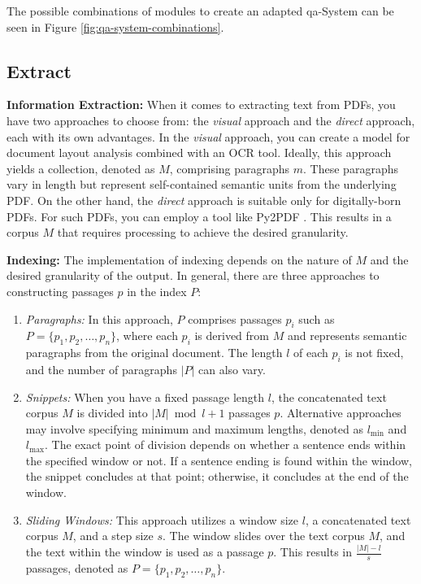 The possible combinations of modules to create an adapted \gls{qa}-System can be seen in Figure \ref{fig:qa-system-combinations}.


\subsection{Extract}
\label{subsec:extract}

\textbf{Information Extraction:} When it comes to extracting text from PDFs, you have two approaches to choose from: the \textit{visual} approach and the \textit{direct} approach, each with its own advantages. In the \textit{visual} approach, you can create a model for document layout analysis combined with an OCR tool. Ideally, this approach yields a collection, denoted as $M$, comprising paragraphs $m$. These paragraphs vary in length but represent self-contained semantic units from the underlying PDF. On the other hand, the \textit{direct} approach is suitable only for digitally-born PDFs. For such PDFs, you can employ a tool like Py2PDF \cite{noauthor_welcome_nodate}. This results in a corpus $M$ that requires processing to achieve the desired granularity.

\textbf{Indexing:} The implementation of indexing depends on the nature of $M$ and the desired granularity of the output. In general, there are three approaches to constructing passages $p$ in the index $P$:

\begin{enumerate}
    \item \textit{Paragraphs:} In this approach, $P$ comprises passages $p_i$ such as $P = \{p_1, p_2, \ldots, p_n\}$, where each $p_i$ is derived from $M$ and represents semantic paragraphs from the original document. The length $l$ of each $p_i$ is not fixed, and the number of paragraphs $|P|$ can also vary.
    \item \textit{Snippets:} When you have a fixed passage length $l$, the concatenated text corpus $M$ is divided into $|M|\bmod{l} + 1$ passages $p$. Alternative approaches may involve specifying minimum and maximum lengths, denoted as $l_{\text{min}}$ and $l_{\text{max}}$. The exact point of division depends on whether a sentence ends within the specified window or not. If a sentence ending is found within the window, the snippet concludes at that point; otherwise, it concludes at the end of the window.
    \item \textit{Sliding Windows:} This approach utilizes a window size $l$, a concatenated text corpus $M$, and a step size $s$. The window slides over the text corpus $M$, and the text within the window is used as a passage $p$. This results in $\frac{|M| - l}{s}$ passages, denoted as $P = \{p_1, p_2, \ldots, p_n\}$.
\end{enumerate}

